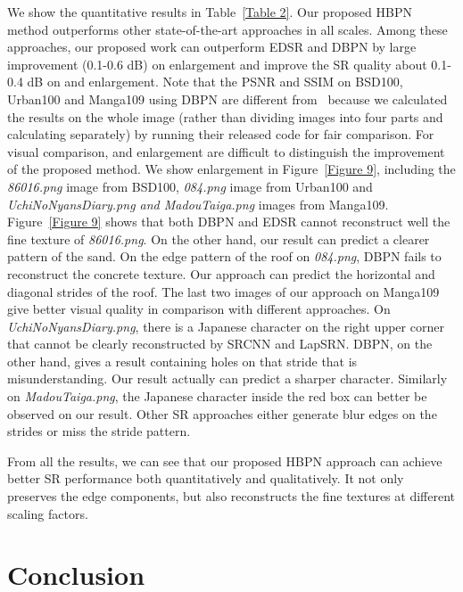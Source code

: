 \documentclass[10pt,twocolumn,letterpaper]{article}
\begin{document}
We show the quantitative results in Table~\ref{Table 2}. Our proposed HBPN method outperforms other state-of-the-art approaches in all scales. Among these approaches, our proposed work can outperform EDSR and DBPN by large improvement (0.1-0.6 dB) on  enlargement and improve the SR quality about 0.1-0.4 dB on  and  enlargement. Note that the PSNR and SSIM on BSD100, Urban100 and Manga109 using DBPN are different from~\cite{DBPN} because we calculated the results on the whole image (rather than dividing images into four parts and calculating separately) by running their released code for fair comparison. For visual comparison,  and  enlargement are difficult to distinguish the improvement of the proposed method. We show  enlargement in Figure~\ref{Figure 9}, including the \textit{86016.png} image from BSD100, \textit{084.png} image from Urban100 and \textit{UchiNoNyansDiary.png and MadouTaiga.png} images from Manga109. Figure~\ref{Figure 9} shows that both DBPN and EDSR cannot reconstruct well the fine texture of \textit{86016.png}. On the other hand, our result can predict a clearer pattern of the sand. On the edge pattern of the roof on \textit{084.png}, DBPN fails to reconstruct the concrete texture. Our approach can predict the horizontal and diagonal strides of the roof. The last two images of our approach on Manga109 give better visual quality in comparison with different approaches. On \textit{UchiNoNyansDiary.png}, there is a Japanese character on the right upper corner that cannot be clearly reconstructed by SRCNN and LapSRN. DBPN, on the other hand, gives a result containing holes on that stride that is misunderstanding. Our result actually can predict a sharper character. Similarly on \textit{MadouTaiga.png}, the Japanese character inside the red box can better be observed on our result. Other SR approaches either generate blur edges on the strides or miss the stride pattern.

From all the results, we can see that our proposed HBPN approach can achieve better SR performance both quantitatively and qualitatively. It not only preserves the edge components, but also reconstructs the fine textures at different scaling factors. 
\section{Conclusion}
\end{document}
